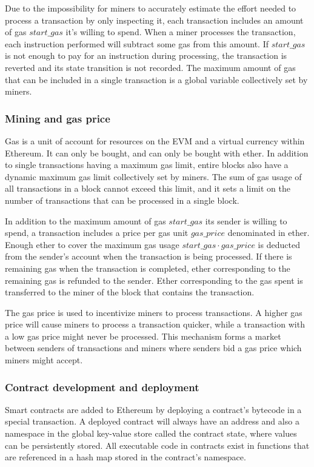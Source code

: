 Due to the impossibility for miners to accurately estimate the effort needed to process a transaction by only inspecting it, each transaction includes an amount of gas $start\_gas$ it's willing to spend. When a miner processes the transaction, each instruction performed will subtract some gas from this amount. If $start\_gas$ is not enough to pay for an instruction during processing, the transaction is reverted and its state transition is not recorded. The maximum amount of gas that can be included in a single transaction is a global variable collectively set by miners. 

\subsubsection{Mining and gas price}
Gas is a unit of account for resources on the EVM and a virtual currency within Ethereum. It can only be bought, and can only be bought with ether. In addition to single transactions having a maximum gas limit, entire blocks also have a dynamic maximum gas limit collectively set by miners. The sum of gas usage of all transactions in a block cannot exceed this limit, and it sets a limit on the number of transactions that can be processed in a single block. 

In addition to the maximum amount of gas $start\_gas$ its sender is willing to spend, a transaction includes a price per gas unit $gas\_price$ denominated in ether. Enough ether to cover the maximum gas usage $start\_gas \cdot gas\_price$ is deducted from the sender's account when the transaction is being processed. If there is remaining gas when the transaction is completed, ether corresponding to the remaining gas is refunded to the sender. Ether corresponding to the gas spent is transferred to the miner of the block that contains the transaction.

The gas price is used to incentivize miners to process transactions. A higher gas price will cause miners to process a transaction quicker, while a transaction with a low gas price might never be processed. This mechanism forms a market between senders of transactions and miners where senders bid a gas price which miners might accept. 

\subsubsection{Contract development and deployment}
Smart contracts are added to Ethereum by deploying a contract's bytecode in a special transaction. A deployed contract will always have an address and also a namespace in the global key-value store called the contract state, where values can be persistently stored. All executable code in contracts exist in functions that are referenced in a hash map stored in the contract's namespace.

